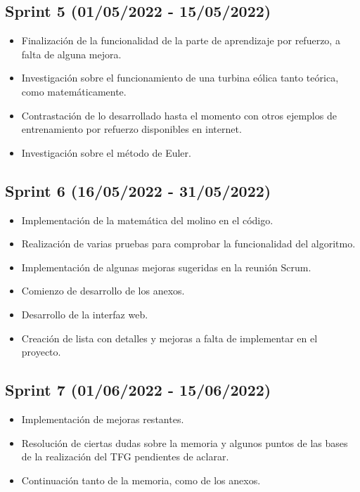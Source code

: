 \subsection{Sprint 5 (01/05/2022 - 15/05/2022)}
\begin{itemize}
    \item Finalización de la funcionalidad de la parte de aprendizaje por refuerzo, a falta de alguna mejora.
    \item Investigación sobre el funcionamiento de una turbina eólica tanto teórica, como matemáticamente.
    \item Contrastación de lo desarrollado hasta el momento con otros ejemplos de entrenamiento por refuerzo disponibles en internet.
    \item Investigación sobre el método de Euler.
\end{itemize}

\subsection{Sprint 6 (16/05/2022 - 31/05/2022)}
\begin{itemize}
    \item Implementación de la matemática del molino en el código.
    \item Realización de varias pruebas para comprobar la funcionalidad del algoritmo.
    \item Implementación de algunas mejoras sugeridas en la reunión Scrum.
    \item Comienzo de desarrollo de los anexos.
    \item Desarrollo de la interfaz web.
    \item Creación de lista con detalles y mejoras a falta de implementar en el proyecto.
\end{itemize}

\subsection{Sprint 7 (01/06/2022 - 15/06/2022)}
\begin{itemize}
    \item Implementación de mejoras restantes.
    \item Resolución de ciertas dudas sobre la memoria y algunos puntos de las bases de la realización del TFG pendientes de aclarar.
    \item Continuación tanto de la memoria, como de los anexos.
\end{itemize}

